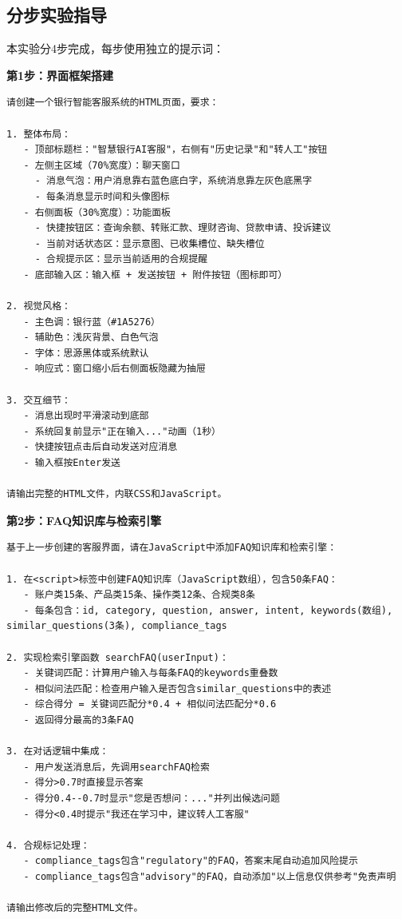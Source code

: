\subsection{分步实验指导}

本实验分4步完成，每步使用独立的提示词：

\textbf{第1步：界面框架搭建}

\begin{practicebox}[步骤1——界面搭建提示词]
\begin{lstlisting}
请创建一个银行智能客服系统的HTML页面，要求：

1. 整体布局：
   - 顶部标题栏："智慧银行AI客服"，右侧有"历史记录"和"转人工"按钮
   - 左侧主区域（70%宽度）：聊天窗口
     - 消息气泡：用户消息靠右蓝色底白字，系统消息靠左灰色底黑字
     - 每条消息显示时间和头像图标
   - 右侧面板（30%宽度）：功能面板
     - 快捷按钮区：查询余额、转账汇款、理财咨询、贷款申请、投诉建议
     - 当前对话状态区：显示意图、已收集槽位、缺失槽位
     - 合规提示区：显示当前适用的合规提醒
   - 底部输入区：输入框 + 发送按钮 + 附件按钮（图标即可）

2. 视觉风格：
   - 主色调：银行蓝（#1A5276）
   - 辅助色：浅灰背景、白色气泡
   - 字体：思源黑体或系统默认
   - 响应式：窗口缩小后右侧面板隐藏为抽屉

3. 交互细节：
   - 消息出现时平滑滚动到底部
   - 系统回复前显示"正在输入..."动画（1秒）
   - 快捷按钮点击后自动发送对应消息
   - 输入框按Enter发送

请输出完整的HTML文件，内联CSS和JavaScript。
\end{lstlisting}
\end{practicebox}

\textbf{第2步：FAQ知识库与检索引擎}

\begin{practicebox}[步骤2——知识库提示词]
\begin{lstlisting}
基于上一步创建的客服界面，请在JavaScript中添加FAQ知识库和检索引擎：

1. 在<script>标签中创建FAQ知识库（JavaScript数组），包含50条FAQ：
   - 账户类15条、产品类15条、操作类12条、合规类8条
   - 每条包含：id, category, question, answer, intent, keywords(数组), similar_questions(3条), compliance_tags

2. 实现检索引擎函数 searchFAQ(userInput)：
   - 关键词匹配：计算用户输入与每条FAQ的keywords重叠数
   - 相似问法匹配：检查用户输入是否包含similar_questions中的表述
   - 综合得分 = 关键词匹配分*0.4 + 相似问法匹配分*0.6
   - 返回得分最高的3条FAQ

3. 在对话逻辑中集成：
   - 用户发送消息后，先调用searchFAQ检索
   - 得分>0.7时直接显示答案
   - 得分0.4--0.7时显示"您是否想问：..."并列出候选问题
   - 得分<0.4时提示"我还在学习中，建议转人工客服"

4. 合规标记处理：
   - compliance_tags包含"regulatory"的FAQ，答案末尾自动追加风险提示
   - compliance_tags包含"advisory"的FAQ，自动添加"以上信息仅供参考"免责声明

请输出修改后的完整HTML文件。
\end{lstlisting}
\end{practicebox}

